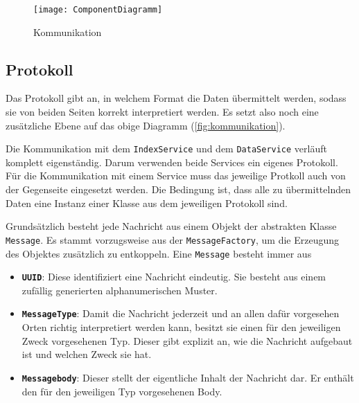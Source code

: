     \begin{figure}[H]
    \centering
    \texttt{[image: ComponentDiagramm]}
    \caption{Kommunikation}
    \label{fig:kommunikation}
    \end{figure}
    

\subsection{Protokoll}\label{section:protokoll}


Das Protokoll gibt an, in welchem Format die Daten übermittelt werden, sodass sie von beiden Seiten korrekt interpretiert werden. Es setzt also noch eine zusätzliche Ebene auf das obige Diagramm (\autoref{fig:kommunikation}).



Die Kommunikation mit dem \texttt{IndexService} und dem \texttt{DataService} verläuft komplett eigenständig. Darum verwenden beide Services ein eigenes Protokoll. Für die Kommunikation mit einem Service muss das jeweilige Protkoll auch von der Gegenseite eingesetzt werden. Die Bedingung ist, dass alle zu übermittelnden Daten eine Instanz einer Klasse aus dem jeweiligen Protokoll sind.
    

Grundsätzlich besteht jede Nachricht aus einem Objekt der abstrakten Klasse \texttt{Mes\-sa\-ge}. Es stammt vorzugsweise aus der \texttt{MessageFactory}, um die Erzeugung des Objektes zusätzlich zu entkoppeln. Eine \texttt{Mes\-sa\-ge} besteht immer aus 

\begin{itemize}
    \item \textbf{\texttt{UUID}}:
    Diese identifiziert eine Nachricht eindeutig. Sie besteht aus einem zufällig generierten alphanumerischen Muster.
    \item \textbf{\texttt{MessageType}}:
    Damit die Nachricht jederzeit und an allen dafür vorgesehen Orten richtig interpretiert werden kann, besitzt sie einen für den jeweiligen Zweck vorgesehenen Typ. Dieser gibt explizit an, wie die Nachricht aufgebaut ist und welchen Zweck sie hat.
    \item \textbf{\texttt{Messagebody}}:
    Dieser stellt der eigentliche Inhalt der Nachricht dar. Er enthält den für den jeweiligen Typ vorgesehenen Body.
\end{itemize}

